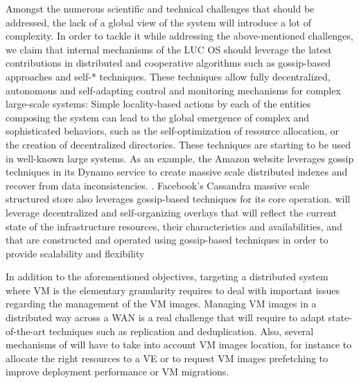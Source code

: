 Amongst the numerous scientific and technical challenges that should be addressed, 
the lack of a global view of the system will introduce a lot
of complexity. In order to tackle it while addressing the above-mentioned
challenges, we claim that internal mechanisms of the LUC OS should leverage 
the latest contributions in distributed and
cooperative algorithms such as gossip-based approaches and self-* techniques.
These techniques allow fully decentralized, autonomous and self-adapting
control and monitoring mechanisms for complex large-scale systems: Simple
locality-based actions by each of the entities composing the system can lead to
the global emergence of complex and sophisticated behaviors, such as the
self-optimization of resource allocation, or the creation of decentralized
directories. These techniques are starting to be used in well-known large
systems. As an example, the Amazon website leverages gossip techniques in its
Dynamo service \cite{decandia:2007} to create massive scale distributed
indexes and recover from data inconsistencies. . Facebook’s Cassandra massive
scale structured store \cite{lakshman:2010} also leverages gossip-based
techniques for its core operation. \discovery will leverage decentralized and
self-organizing overlays that will reflect the current state of the
infrastructure resources, their characteristics and availabilities, and that
are constructed and operated using gossip-based techniques in order to provide
scalability and flexibility


In addition to the aforementioned objectives, targeting a distributed system
where VM is the elementary granularity requires to deal with important issues
regarding the management of the VM images. Managing VM images in a distributed
way across a WAN is a real challenge that will require to adapt
state-of-the-art techniques such as replication and deduplication. Also,
several mechanisms of \discovery will have to take into account VM images
location, for instance to allocate the right resources to a VE  or to request
VM images prefetching to improve deployment performance or VM migrations.



